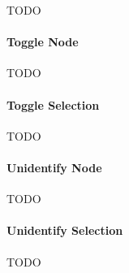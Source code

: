 TODO

\paragraph{Toggle Node}

TODO

\paragraph{Toggle Selection}

TODO

\paragraph{Unidentify Node}

TODO

\paragraph{Unidentify Selection}

TODO
